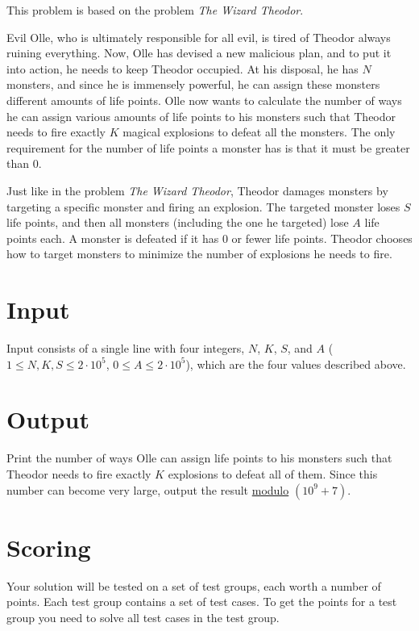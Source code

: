 
This problem is based on the problem \textit{The Wizard Theodor}.  
 
Evil Olle, who is ultimately responsible for all evil, is tired of Theodor always ruining everything.
Now, Olle has devised a new malicious plan, and to put it into action, he needs to keep Theodor occupied.
At his disposal, he has $N$ monsters, and since he is immensely powerful, he can assign these monsters
different amounts of life points. Olle now wants to calculate the number of ways he can assign various
amounts of life points to his monsters such that Theodor needs to fire exactly $K$ magical explosions
to defeat all the monsters. The only requirement for the number of life points a monster has is that
it must be greater than $0$.  
 
Just like in the problem \textit{The Wizard Theodor}, Theodor damages monsters by targeting a specific
monster and firing an explosion. The targeted monster loses $S$ life points, and then all monsters
(including the one he targeted) lose $A$ life points each. A monster is defeated if it has $0$ or fewer
life points. Theodor chooses how to target monsters to minimize the number of explosions he needs to fire.

\section*{Input}
Input consists of a single line with four integers, $N$, $K$, $S$, and $A$
($1 \leq N, K, S \leq 2 \cdot 10^5$, $0 \leq A \leq 2 \cdot 10^5$),
which are the four values described above.

\section*{Output}
Print the number of ways Olle can assign life points to his monsters such that Theodor needs to fire
exactly $K$ explosions to defeat all of them. Since this number can become very large, output the result
\href{https://en.wikipedia.org/wiki/Modulo}{modulo} $(10^9+7)$.

\section*{Scoring}
Your solution will be tested on a set of test groups, each worth a number of points. Each test group contains
a set of test cases. To get the points for a test group you need to solve all test cases in the test group.

